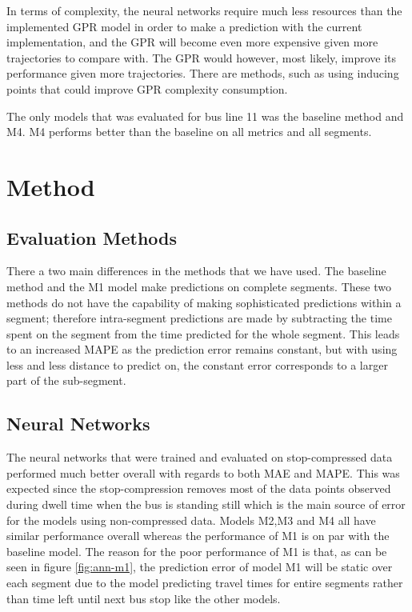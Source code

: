 In terms of complexity, the neural networks require much less resources than the implemented GPR model in order to make a prediction with the current implementation, and the GPR will become even more expensive given more trajectories to compare with. The GPR would however, most likely, improve its performance given more trajectories. There are methods, such as using inducing points that could improve GPR complexity consumption.

The only models that was evaluated for bus line 11 was the baseline method and M4. M4 performs better than the baseline on all metrics and all segments. 

\section{Method}
\label{sec:discussion-method}
\subsection{Evaluation Methods}
There a two main differences in the methods that we have used. The baseline method and the M1 model make predictions on complete segments. These two methods do not have the capability of making sophisticated predictions within a segment; therefore intra-segment predictions are made by subtracting the time spent on the segment from the time predicted for the whole segment. This leads to an increased MAPE as the prediction error remains constant, but with using less and less distance to predict on, the constant error corresponds to a larger part of the sub-segment.

\subsection{Neural Networks}
The neural networks that were trained and evaluated on stop-compressed data performed much better overall with regards to both MAE and MAPE. This was expected since the stop-compression removes most of the data points observed during dwell time when the bus is standing still which is the main source of error for the models using non-compressed data. Models M2,M3 and M4 all have similar performance overall whereas the performance of M1 is on par with the baseline model. The reason for the poor performance of M1 is that, as can be seen in figure \ref{fig:ann-m1}, the prediction error of model M1 will be static over each segment due to the model predicting travel times for entire segments rather than time left until next bus stop like the other models.

